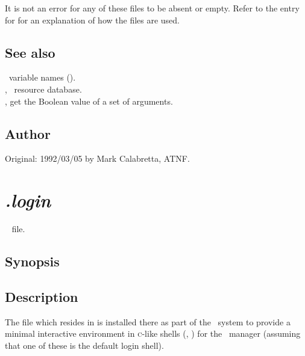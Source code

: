 \noindent
It is not an error for any of these files to be absent or empty.  Refer to
the entry for  for an explanation of how the 
files are used.

\subsection*{See also}

\aipspp\ variable names ().\\
, \aipspp\ resource database.\\
, get the Boolean value of a set of arguments.

\subsection*{Author}

Original: 1992/03/05 by Mark Calabretta, ATNF.


\newpage
\section{\textit{.login}}
\label{.login}

\aipspp\  file.

\subsection*{Synopsis}

\begin{synopsis}
\end{synopsis}

\subsection*{Description}

The  file which resides in  is installed there
as part of the \aipspp\ system to provide a minimal interactive environment
in \textsc{c}-like shells (, ) for the \aipspp\ 
manager (assuming that one of these is the default login shell).


